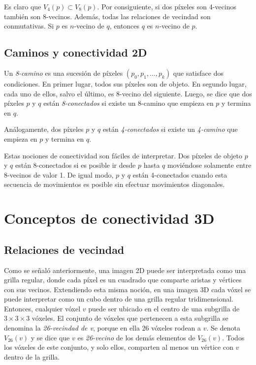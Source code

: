 Es claro que $V_{4}(p) \subset V_{8}(p)$. Por consiguiente, si dos píxeles son 4-vecinos también son 8-vecinos. Además, todas las relaciones de vecindad son conmutativas. Si $p$ es $n$-vecino de $q$, entonces $q$ es $n$-vecino de $p$.

\subsection{Caminos y conectividad 2D} \label{conn2D}

Un \textit{8-camino} es una sucesión de píxeles $(p_{0}, p_{1}, \ldots, p_{k})$ que satisface dos condiciones. En primer lugar, todos sus píxeles son de objeto. En segundo lugar, cada uno de ellos, salvo el último, es 8-vecino del siguiente. Luego, se dice que dos píxeles $p$ y $q$ están \textit{8-conectados} si existe un 8-camino que empieza en $p$ y termina en $q$.

Análogamente, dos píxeles $p$ y $q$ están \textit{4-conectados} si existe un \textit{4-camino} que empieza en $p$ y termina en $q$.

Estas nociones de conectividad son fáciles de interpretar. Dos píxeles de objeto $p$ y $q$ están 8-conectados si es posible ir desde $p$ hasta $q$ moviéndose solamente entre 8-vecinos de valor 1. De igual modo, $p$ y $q$ están 4-conectados cuando esta secuencia de movimientos es posible sin efectuar movimientos diagonales.

\section{Conceptos de conectividad 3D}

\subsection{Relaciones de vecindad}
Como se señaló anteriormente, una imagen 2D puede ser interpretada como una grilla regular, donde cada píxel es un cuadrado que comparte aristas y vértices con sus vecinos. Extendiendo esta misma noción, en una imagen 3D cada vóxel se puede interpretar como un cubo dentro de una grilla regular tridimensional. Entonces, cualquier vóxel $v$ puede ser ubicado en el centro de una subgrilla de $3\times3\times3$ vóxeles. El conjunto de vóxeles que pertenecen a esta subgrilla se denomina la \textit{26-vecindad de v}, porque en ella 26 vóxeles rodean a $v$. Se denota $V_{26}(v)$ y se dice que $v$ es \textit{26-vecino} de los demás elementos de $V_{26}(v)$. Todos los vóxeles de este conjunto, y solo ellos, comparten al menos un vértice con $v$ dentro de la grilla.

